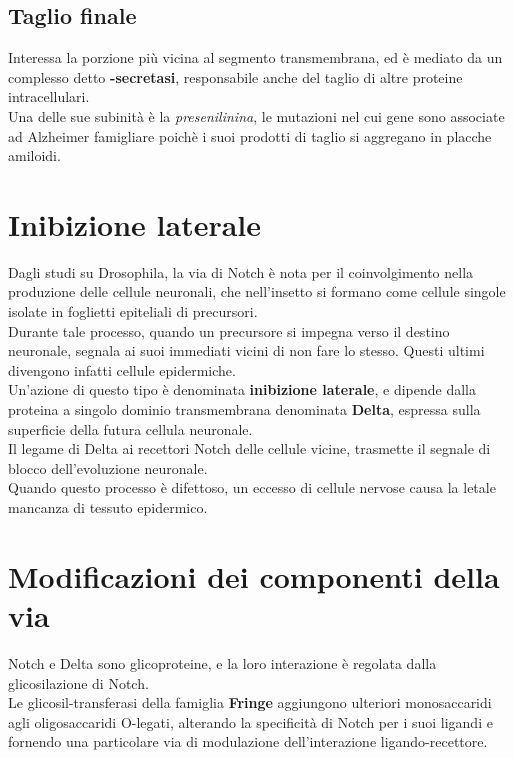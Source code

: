 \documentclass[a4paper, 12pt]{article}
\begin{document}
\subsection{Taglio finale}
Interessa la porzione più vicina al segmento transmembrana, ed è mediato da un complesso detto \textbf{\textgamma-secretasi}, responsabile anche del taglio di altre proteine intracellulari.\\
Una delle sue subinità è la \textit{presenilinina}, le mutazioni nel cui gene sono associate ad Alzheimer famigliare poichè i suoi prodotti di taglio si aggregano in placche amiloidi.

\section{Inibizione laterale}
Dagli studi su Drosophila, la via di Notch è nota per il coinvolgimento nella produzione delle cellule neuronali, che nell'insetto si formano come cellule singole isolate in foglietti epiteliali di precursori.\\
Durante tale processo, quando un precursore si impegna verso il destino neuronale, segnala ai suoi immediati vicini di non fare lo stesso. Questi ultimi divengono infatti cellule epidermiche.\\
Un'azione di questo tipo è denominata \textbf{inibizione laterale}, e dipende dalla proteina a singolo dominio transmembrana denominata \textbf{Delta}, espressa sulla superficie della futura cellula neuronale.\\
Il legame di Delta ai recettori Notch delle cellule vicine, trasmette il segnale di blocco dell'evoluzione neuronale.\\
Quando questo processo è difettoso, un eccesso di cellule nervose causa la letale mancanza di tessuto epidermico.

\section{Modificazioni dei componenti della via}
Notch e Delta sono glicoproteine, e la loro interazione è regolata dalla glicosilazione di Notch.\\
Le glicosil-transferasi della famiglia \textbf{Fringe} aggiungono ulteriori monosaccaridi agli oligosaccaridi O-legati, alterando la specificità di Notch per i suoi ligandi e fornendo una particolare via di modulazione dell'interazione ligando-recettore.
\end{document}
